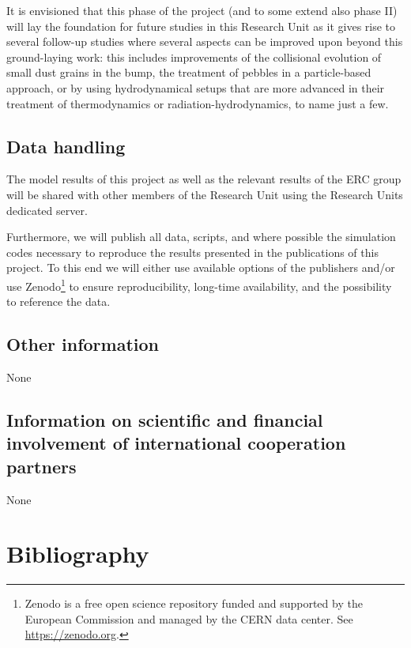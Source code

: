 \documentclass[10pt,fleqn,twoside]{article}
\begin{document}
It is envisioned that this phase of the project (and 
to some extend also phase II) will lay the foundation for future
studies in this Research Unit as it gives rise to several follow-up
studies where several aspects can be improved upon beyond this
ground-laying work: this includes improvements of the collisional
evolution of small dust grains in the bump, the treatment of pebbles
in a particle-based approach, or by using hydrodynamical setups that
are more advanced in their treatment of thermodynamics or
radiation-hydrodynamics, to name just a few.

\subsection{Data handling}

The model results of this project as well as the relevant results of
the ERC group will be shared with other members of the Research Unit
using the Research Units dedicated server.

Furthermore, we will publish all data, scripts, and where possible the
simulation codes necessary to reproduce the results presented in the
publications of this project. To this end we will either use available
options of the publishers and/or use Zenodo\footnote{Zenodo is a free
open science repository funded and supported by the European
Commission and managed by the CERN data center. See
\url{https://zenodo.org}.} to ensure reproducibility, long-time
availability, and the possibility to reference the data.



\subsection{Other information}


None

\subsection{Information on scientific and financial involvement of international cooperation partners}

None

\section{Bibliography}
\end{document}
